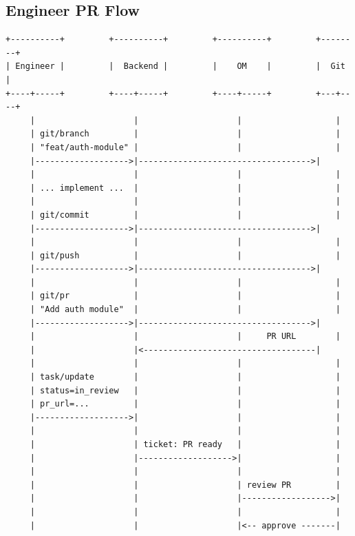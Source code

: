 \documentclass[11pt,a4paper]{article}
\begin{document}
\subsection{Engineer PR Flow}

\begin{verbatim}
+----------+         +----------+         +----------+         +--------+
| Engineer |         |  Backend |         |    OM    |         |  Git   |
+----+-----+         +----+-----+         +----+-----+         +---+----+
     |                    |                    |                   |
     | git/branch         |                    |                   |
     | "feat/auth-module" |                    |                   |
     |------------------->|----------------------------------->|
     |                    |                    |                   |
     | ... implement ...  |                    |                   |
     |                    |                    |                   |
     | git/commit         |                    |                   |
     |------------------->|----------------------------------->|
     |                    |                    |                   |
     | git/push           |                    |                   |
     |------------------->|----------------------------------->|
     |                    |                    |                   |
     | git/pr             |                    |                   |
     | "Add auth module"  |                    |                   |
     |------------------->|----------------------------------->|
     |                    |                    |     PR URL        |
     |                    |<-----------------------------------|
     |                    |                    |                   |
     | task/update        |                    |                   |
     | status=in_review   |                    |                   |
     | pr_url=...         |                    |                   |
     |------------------->|                    |                   |
     |                    |                    |                   |
     |                    | ticket: PR ready   |                   |
     |                    |------------------->|                   |
     |                    |                    |                   |
     |                    |                    | review PR         |
     |                    |                    |------------------>|
     |                    |                    |                   |
     |                    |                    |<-- approve -------|

\end{verbatim}
\end{document}

